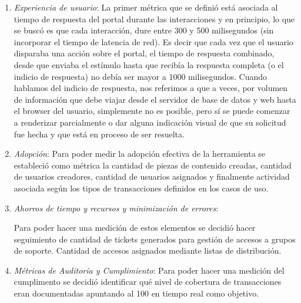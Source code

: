 \begin{enumerate}
    \item \textit{Experiencia de usuario}: \label{success:metric_ux}
	La primer métrica que se definió está asociada al tiempo de respuesta del portal durante las interacciones y en principio, lo que se buscó es que cada interacción, dure entre 300 y 500 milisegundos (sin incorporar el tiempo de latencia de red). Es decir que cada vez que el usuario disparaba una acción sobre el portal, el tiempo de respuesta combinado, desde que enviaba el estímulo hasta que recibía la respuesta completa (o el indicio de respuesta) no debía ser mayor a 1000 milisegundos. Cuando hablamos del indicio de respuesta, nos referimos a que a veces, por volumen de información que debe viajar desde el servidor de base de datos y web hasta el browser del usuario, simplemente no es posible, pero sí se puede comenzar a renderizar parcialmente o dar alguna indicación visual de que su solicitud fue hecha y que está en proceso de ser resuelta.

    \item \textit{Adopción}: \label{success:adoption}
    Para poder medir la adopción efectiva de la herramienta se estableció como métrica la cantidad de piezas de contenido creadas, cantidad de usuarios creadores, cantidad de usuarios asignados y finalmente actividad asociada según los tipos de transacciones definidos en los casos de uso.

    \item \textit{Ahorros de tiempo y recursos y minimización de errores}: \label{success:timesaving}
    
    Para poder hacer una medición de estos elementos se decidió hacer seguimiento de cantidad de tickets generados para gestión de accesos a grupos de soporte. Cantidad de accesos asignados mediante listas de distribución.

    \item \textit{Métricas de Auditoría y Cumplimiento}: \label{success:compliance}
    Para poder hacer una medición del cumplimento se decidió identificar qué nivel de cobertura de transacciones eran documentadas apuntando al 100 en tiempo real como objetivo.

\end{enumerate}
